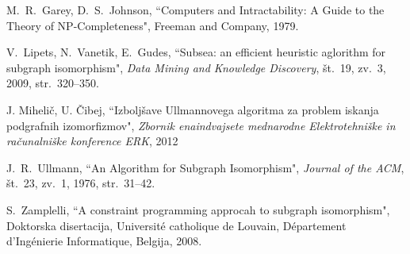 \documentclass[a4paper, 12pt, ]{book}
\begin{document}
\begin{thebibliography}{99}
	 M.~R.~Garey, D.~S.~Johnson, ``Computers and Intractability: A Guide to the Theory of NP-Completeness",
		Freeman and Company, 1979.
	
	 V.~Lipets, N.~Vanetik, E.~Gudes, ``Subsea: an efficient heuristic aglorithm for subgraph isomorphism",
		\textit {Data Mining and Knowledge Discovery}, št.~19, zv.~3, 2009, str.~320--350.

	 J. Mihelič, U. Čibej, ``Izboljšave Ullmannovega algoritma za problem iskanja podgrafnih izomorfizmov",
		\textit{Zbornik enaindvajsete mednarodne Elektrotehniške in računalniške konference ERK}, 2012

	 J.~R.~Ullmann, ``An Algorithm for Subgraph Isomorphism",
		\textit{Journal of the ACM}, št.~23, zv.~1, 1976, str.~31--42.

	 S.~Zamplelli, ``A constraint programming approcah to subgraph isomorphism", Doktorska disertacija, 
	Universit\'{e} catholique de Louvain, D\'{e}partement d’Ing\'{e}nierie Informatique, Belgija, 2008.
	

\end{thebibliography}
\end{document}
